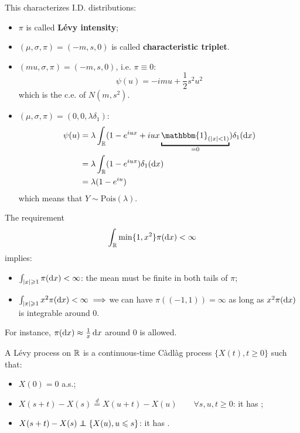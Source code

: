 \documentclass{article}
\begin{document}
	This characterizes I.D. distributions:
	\begin{itemize}
		\item $\pi$ is called \textbf{L\'evy intensity};
		\item $(\mu,\sigma,\pi)=(-m,s,0)$ is called \textbf{characteristic triplet}.
	\end{itemize}
	\begin{example}
		\begin{itemize}
			\item $(mu,\sigma,\pi)=(-m,s,0)$, i.e. $\pi\equiv0$:
			\[
			\psi(u)=-imu+\frac{1}{2}s^2u^2
			\]which is the c.e. of $N(m,s^2)$.
			\item $(\mu,\sigma,\pi)=(0,0,\lambda\delta_1)$:
			\begin{align*}
				\psi(u)&=\lambda\int_\R(1-e^{iux}+iux\underbracket{\mathbbm{1}_{(|x|<1)}}_{\mathclap{=0}})\delta_1(\dif x)\\
				&=\lambda\int_\R(1-e^{iux})\delta_1(\dif x)\\
				&=\lambda(1-e^{iu})
			\end{align*}which means that $Y\sim\text{Pois}(\lambda)$.
		\end{itemize}
	\end{example}
	The requirement \[\int_{\mathbb{R}}\min\{1,x^2\}\pi(\mathop{}\!\mathrm{d} x)<\infty
	\]
	implies:
	\begin{itemize}
		\item $\int_{|x|\geqslant1}\pi(\mathop{}\!\mathrm{d} x)<\infty$: the mean must be finite in both tails of $\pi$;
		\item $\int_{|x|\geqslant1}x^2\pi(\mathop{}\!\mathrm{d} x)<\infty\implies$we can have $\pi\left((-1,1)\right)=\infty$ as long as $x^2\pi(\mathop{}\!\mathrm{d} x)$ is integrable around 0.
	\end{itemize}
	For instance, $\pi(\mathop{}\!\mathrm{d} x)\approx\frac{1}{x}\mathop{}\!\mathrm{d} x$ around 0 is allowed.
	\begin{figure}[H]
		\centering
		
	\end{figure}
	\begin{definition}
			A L\'evy process on $\mathbb{R}$ is a continuous-time Càdlàg process $\{X(t),t\geqslant0\}$ such that:
		\begin{itemize}
			\item $X(0)=0$ a.s.;
			\item $X(s+t)-X(s)\stackrel{d}{=}X(u+t)-X(u)\qquad\forall s, u,t\geqslant0$: it has ;
			\item $X(s+t)-X(s)\independent\{X(u),u\leqslant s\}$: it has .
		\end{itemize}
	\end{definition}
\end{document}
